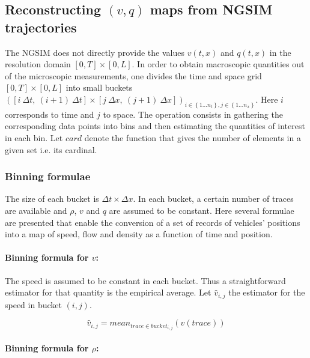 \documentclass[preprint]{elsarticle}
\begin{document}
\subsection{Reconstructing $\left(v,q\right)$ maps from NGSIM trajectories}

The NGSIM does not directly provide the values $v\left(t,x\right)$
and $q\left(t,x\right)$ in the resolution domain $\left[0,T\right]\times\left[0,L\right]$.
In order to obtain macroscopic quantities out of the microscopic measurements,
one divides the time and space grid $\left[0,T\right]\times\left[0,L\right]$
into small buckets $\left(\left[i\:\Delta t,\:\left(i+1\right)\:\Delta t\right]\times\left[j\:\Delta x,\:\left(j+1\right)\:\Delta x\right]\right)_{i\in\left\{ 1\ldots n_{t}\right\} ,j\in\left\{ 1\ldots n_{x}\right\} }$.
Here $i$ corresponds to time and $j$ to space. The operation consists
in gathering the corresponding data points into bins and then estimating
the quantities of interest in each bin. Let $card$ denote the function
that gives the number of elements in a given set i.e. its cardinal.


\subsubsection{Binning formulae}

The size of each bucket is $\Delta t\times\Delta x$. In each bucket,
a certain number of traces are available and $\rho$, $v$ and $q$
are assumed to be constant. Here several formulae are presented that
enable the conversion of a set of records of vehicles' positions into
a map of speed, flow and density as a function of time and position.


\paragraph{Binning formula for $v$:}

The speed is assumed to be constant in each bucket. Thus a straightforward
estimator for that quantity is the empirical average. Let $\widehat{v}_{i,j}$
the estimator for the speed in bucket $\left(i,j\right)$.

\[
\widehat{v}_{i,j}=mean_{trace\in bucket_{i,j}}\left(v\left(trace\right)\right)
\]



\paragraph{Binning formula for $\rho$:}
\end{document}

